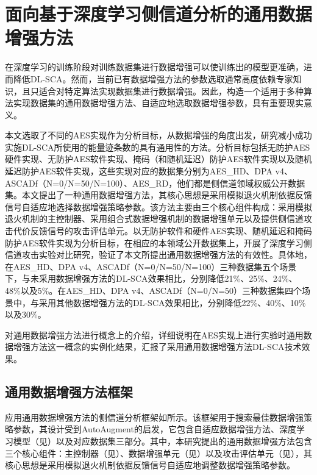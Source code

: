 \chapter{面向基于深度学习侧信道分析的通用数据增强方法}\label{chap:search1}{
	
	在深度学习的训练阶段对训练数据集进行数据增强可以使训练出的模型更准确，进而降低DL-SCA\chenggongtiaoshu 。然而，当前已有数据增强方法的参数选取通常高度依赖专家知识，且只适合对特定算法实现数据集进行数据增强。因此，构造一个适用于多种算法实现数据集的通用数据增强方法、自适应地选取数据增强参数，具有重要现实意义。
	
	本文选取了不同的AES实现作为分析目标，从数据增强的角度出发，研究减小成功实施DL-SCA所使用的能量迹条数的具有通用性的方法。分析目标包括无防护AES硬件实现、无防护AES软件实现、掩码（和随机延迟）防护AES软件实现以及随机延迟防护AES软件实现，这些实现对应的数据集分别为AES\_HD、DPA v4、ASCADf（N=0/N=50/N=100）、AES\_RD，他们都是侧信道领域权威公开数据集。本文提出了一种通用数据增强方法，其核心思想是采用模拟退火机制依据反馈信号自适应地选择数据增强策略参数。该方法主要由三个核心组件构成：采用模拟退火机制的主控制器、采用组合式数据增强机制的数据增强单元以及提供侧信道攻击代价反馈信号的攻击评估单元。以无防护软件和硬件AES实现、随机延迟和掩码防护AES软件实现为分析目标，在相应的本领域公开数据集上，开展了深度学习侧信道攻击实验对比研究，验证了本文所提出通用数据增强方法的有效性。具体地，在AES\_HD、DPA v4、ASCADf（N=0/N=50/N=100）三种数据集五个场景下，与未采用数据增强方法的DL-SCA效果相比，\chenggongtiaoshu 分别降低21\%、25\%、24\%、48\%以及5\%。在AES\_HD、DPA v4、ASCADf（N=0/N=50）三种数据集四个场景中，与采用其他数据增强方法的DL-SCA效果相比，\chenggongtiaoshu 分别降低22\%、40\%、10\%以及30\%。
	
	{\color{\xchange}
	
	对通用数据增强方法进行概念上的介绍，详细说明在AES实现上进行实验时通用数据增强方法这一概念的实例化结果，汇报了采用通用数据增强方法DL-SCA技术效果。
	}
	
	\section{通用数据增强方法框架}\label{sec:framework}
	应用通用数据增强方法的侧信道分析框架如所示。该框架用于搜索最佳数据增强策略参数，其设计受到AutoAugment\citep{Cubuk19}的启发，它包含自适应数据增强方法、深度学习模型（见）以及对应数据集三部分。其中，本研究提出的通用数据增强方法包含三个核心组件：主控制器（见）、数据增强单元（见）以及攻击评估单元（见），其核心思想是采用模拟退火机制依据反馈信号自适应地调整数据增强策略参数。
	
}
